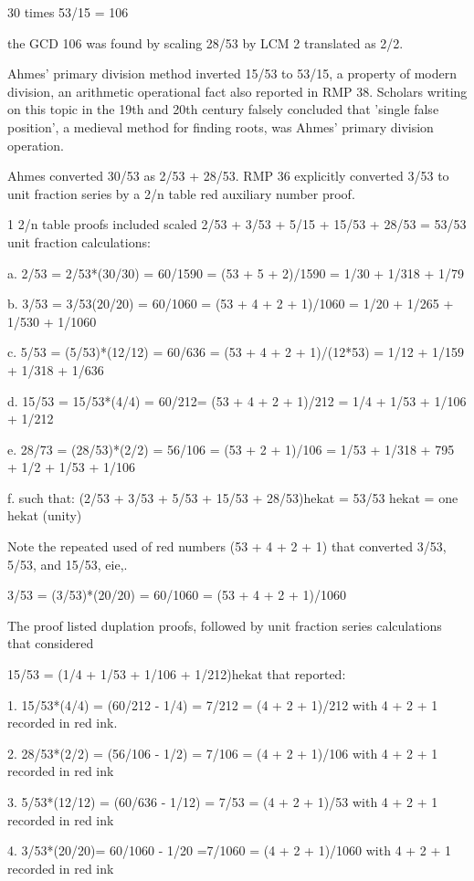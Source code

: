 \documentclass[12pt]{article}
\begin{document}
30 times 53/15 = 106

the GCD 106 was found by scaling 28/53 by LCM 2 translated as 2/2.

Ahmes' primary division method inverted 15/53 to 53/15, a property of modern division, an arithmetic operational fact also reported in RMP 38. Scholars writing on this topic in the 19th and 20th century falsely concluded that 'single false position', a medieval method for finding roots, was Ahmes' primary division operation. 

Ahmes converted 30/53 as 2/53 + 28/53. RMP 36 explicitly converted 3/53 to unit fraction series by a 2/n table red auxiliary number proof.

1 2/n table proofs included scaled 2/53 + 3/53 +  5/15 +  15/53 +  28/53 = 53/53  unit fraction calculations:

a. 2/53 = 2/53*(30/30) = 60/1590 = (53 + 5 + 2)/1590 = 1/30 + 1/318 + 1/79

b. 3/53 = 3/53(20/20) = 60/1060 = (53 + 4 + 2 + 1)/1060 = 1/20 + 1/265 + 1/530 + 1/1060 

c. 5/53 = (5/53)*(12/12) = 60/636 = (53 + 4 + 2 + 1)/(12*53) = 1/12 + 1/159 + 1/318 + 1/636

d. 15/53 = 15/53*(4/4) = 60/212= (53 + 4 + 2 + 1)/212 = 1/4 + 1/53 + 1/106 + 1/212

e. 28/73 = (28/53)*(2/2) = 56/106 = (53 + 2 + 1)/106 = 1/53 + 1/318 + 795 + 1/2 + 1/53 + 1/106

f. such that: (2/53 + 3/53 + 5/53 + 15/53 + 28/53)hekat = 53/53 hekat = one hekat (unity)


Note the repeated used of red numbers (53 + 4 + 2 + 1) that converted 3/53, 5/53, and 15/53, eie,.

 3/53 = (3/53)*(20/20) = 60/1060 = (53 + 4 + 2 + 1)/1060

The proof listed duplation proofs, followed by unit fraction series calculations that considered

15/53 = (1/4 + 1/53 + 1/106 + 1/212)hekat that reported:

1. 15/53*(4/4) = (60/212 - 1/4) = 7/212 = (4 + 2 + 1)/212 with 4 + 2 + 1 recorded in red ink.

2. 28/53*(2/2) = (56/106 - 1/2) =  7/106 = (4 + 2 + 1)/106 with 4 + 2 + 1 recorded in red ink

3. 5/53*(12/12) = (60/636 - 1/12) = 7/53 = (4 + 2 + 1)/53 with 4 + 2 + 1 recorded in red ink

4. 3/53*(20/20)=  60/1060 - 1/20 =7/1060 = (4 + 2 + 1)/1060 with 4 + 2 + 1 recorded in red ink
   
\end{document}
